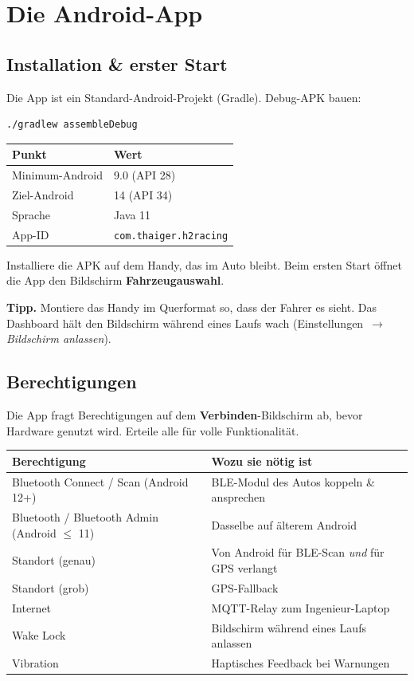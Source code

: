 \documentclass[11pt,a4paper,oneside]{report}
\newcommand{\arrow}{\,$\rightarrow$\,}
\newcommand{\code}[1]{\texttt{#1}}
\begin{document}
\section{Die Android-App}

\subsection{Installation \& erster Start}
Die App ist ein Standard-Android-Projekt (Gradle). Debug-APK bauen:

\begin{lstlisting}
./gradlew assembleDebug
\end{lstlisting}

\begin{tabularx}{\linewidth}{@{}lL@{}}
\toprule
\textbf{Punkt} & \textbf{Wert}\\
\midrule
Minimum-Android & 9.0 (API 28)\\
Ziel-Android & 14 (API 34)\\
Sprache & Java 11\\
App-ID & \code{com.thaiger.h2racing}\\
\bottomrule
\end{tabularx}

\medskip
Installiere die APK auf dem Handy, das im Auto bleibt. Beim ersten Start \"offnet
die App den Bildschirm \textbf{Fahrzeugauswahl}.
\begin{tgnote}
\textbf{Tipp.} Montiere das Handy im Querformat so, dass der Fahrer es sieht. Das
Dashboard h\"alt den Bildschirm w\"ahrend eines Laufs wach (Einstellungen
\arrow{} \emph{Bildschirm anlassen}).
\end{tgnote}

\subsection{Berechtigungen}
Die App fragt Berechtigungen auf dem \textbf{Verbinden}-Bildschirm ab, bevor
Hardware genutzt wird. Erteile alle f\"ur volle Funktionalit\"at.

\begin{tabularx}{\linewidth}{@{}lL@{}}
\toprule
\textbf{Berechtigung} & \textbf{Wozu sie n\"otig ist}\\
\midrule
Bluetooth Connect / Scan (Android 12+) & BLE-Modul des Autos koppeln \& ansprechen\\
Bluetooth / Bluetooth Admin (Android $\le$ 11) & Dasselbe auf \"alterem Android\\
Standort (genau) & Von Android f\"ur BLE-Scan \emph{und} f\"ur GPS verlangt\\
Standort (grob) & GPS-Fallback\\
Internet & MQTT-Relay zum Ingenieur-Laptop\\
Wake Lock & Bildschirm w\"ahrend eines Laufs anlassen\\
Vibration & Haptisches Feedback bei Warnungen\\
\bottomrule
\end{tabularx}
\end{document}
